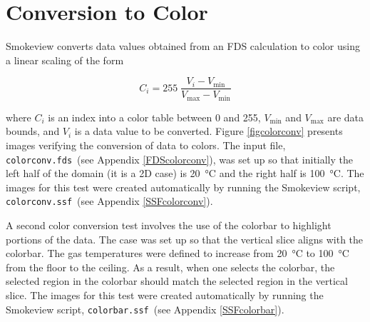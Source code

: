 \documentclass[11pt,twoside]{book}
\begin{document}
\clearpage

\section{Conversion to Color}

Smokeview converts data values obtained from an FDS calculation to color
using a linear scaling of the form

\begin{equation}
C_i=255 \; \frac{V_i-V_{\min}}{V_{\max}-V_{\min}}
\end{equation}

where $C_i$ is an index into a color table between 0 and 255, $V_{\min}$
and $V_{\max}$  are data bounds, and $V_i$ is a data value to be converted.
Figure \ref{figcolorconv} presents images verifying the conversion of data to colors.
The input file, {\tt colorconv.fds}\ (see Appendix \ref{FDScolorconv}), was set up so
that initially the left half of the domain (it is a 2D case) is \SI{20}{\degreeCelsius}
and the right half is \SI{100}{\degreeCelsius}. The images for this test were created
automatically by running the Smokeview script, {\tt colorconv.ssf}\ (see Appendix
\ref{SSFcolorconv}).

A second color conversion test involves the use of the colorbar to highlight
portions of the data.  The case was set up so that the vertical slice aligns
with the colorbar.  The gas temperatures were defined to increase from
\SI{20}{\degreeCelsius} to \SI{100}{\degreeCelsius} from the floor to the ceiling.
As a result, when one selects the colorbar, the selected region in the colorbar
should match the selected region in the vertical slice. The images for this
test were created automatically by running the Smokeview script, {\tt colorbar.ssf}\
(see Appendix \ref{SSFcolorbar}).
\end{document}
